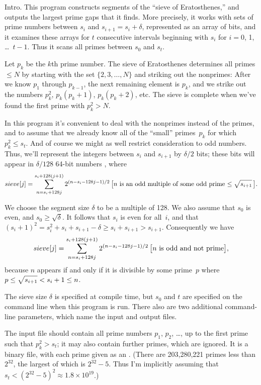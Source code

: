 
\datethis

Intro. This program constructs segments of the ``sieve of
Eratosthenes,''
and outputs the largest prime gaps that it finds. More precisely, it
works with sets of prime numbers between $s_i$ and $s_{i+1}=s_i+\delta$,
represented as an array of bits, and it examines these arrays for
$t$ consecutive intervals beginning with $s_i$ for $i=0$, 1, \dots~$t-1$.
Thus it scans all primes between $s_0$ and $s_t$.

Let $p_k$ be the $k$th prime number. The sieve of Eratosthenes determines
all primes $\le N$ by starting with the set $\{2,3,\ldots,N\}$ and striking
out the nonprimes: After we know $p_1$ through $p_{k-1}$, the next remaining
element is $p_k$, and we strike out the numbers $p_k^2$, $p_k(p_k+1)$,
$p_k(p_k+2)$, etc. The sieve is complete when we've found the
first prime with $p_k^2>N$.

In this program it's convenient to deal with the nonprimes instead of the
primes, and to assume that we already know all of the ``small'' primes~$p_k$
for which $p_k^2\le s_t$.
And of course we might as well restrict consideration to odd numbers.
Thus, we'll represent the integers between $s_i$ and $s_{i+1}$ by
$\delta/2$ bits; these bits will appear in $\delta/128$ 64-bit numbers
, where
$$\PB{\\{sieve}[\|j]}=\sum_{n=s_i+128j}^{s_i+128(j+1)} 2^{(n-s_i-128j-1)/2}
\,\hbox{$\bigl[n$ is an odd multiple of some odd prime
$\le\sqrt{\mathstrut s_{i+1}}\,\bigr]$}.$$

We choose the segment size $\delta$ to be a multiple of 128.
We also assume that $s_0$ is even, and $s_0\ge\sqrt\delta$. It follows
that $s_i$ is even for all~$i$, and that $(s_i+1)^2=s_i^2+s_i+s_{i+1}-\delta
\ge s_i+s_{i+1}>s_{i+1}$. Consequently we have
$$\PB{\\{sieve}[\|j]}=\sum_{n=s_i+128j}^{s_i+128(j+1)} 2^{(n-s_i-128j-1)/2}
\,\hbox{$\bigl[n$ is odd and not prime$\bigr]$},$$
because $n$ appears if and only if it is divisible by some prime~$p$
where $p\le\sqrt{\mathstrut s_{i+1}}<s_i+1\le n$.

\fi

The sieve size $\delta$ is specified at compile time,
but $s_0$ and $t$ are specified on the command line when this program
is run. There also are two additional command-line parameters,
which name the input and output files.

The input file should contain
all prime numbers $p_1$, $p_2$, \dots, up to the first prime such
that $p_k^2>s_t$; it may also contain further primes, which are ignored.
It is a binary file, with each prime given as an .
(There are 203,280,221 primes less than $2^{32}$, the largest of which
is $2^{32}-5$. Thus I'm implicitly assuming that $s_t<(2^{32}-5)^2
\approx 1.8\times10^{19}$.)

